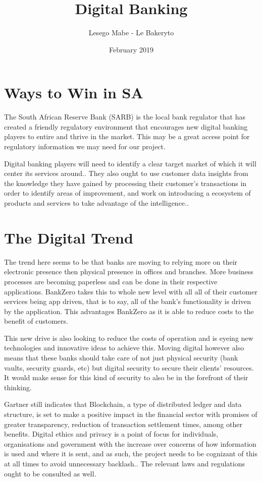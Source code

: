\documentclass{article}
\title{Digital Banking}
\author{Lesego Mabe - Le Bakeryto}
\date{February 2019}
\begin{document}
\maketitle

\section{Ways to Win in SA}

The South African Reserve Bank (SARB) is the local bank regulator that has created a friendly regulatory environment that encourages new digital banking players to entire and thrive in the market.\cite{Website:1} This may be a great access point for regulatory information we may need for our project.

Digital banking players will need to identify a clear target market of which it will center its services around.\cite{Website:1}. They also ought to use customer data insights from the knowledge they have gained by processing their customer's transactions in order to identify areas of improvement, and work on introducing a ecosystem of products and services to take advantage of the intelligence.\cite{Website:1}. 

\section{The Digital Trend}

The trend here seems to be that banks are moving to relying more on their electronic presence then physical presence in offices and branches. More business processes are becoming paperless and can be done in their respective applications. BankZero takes this to whole new level with all all of their customer services being app driven, that is to say, all of the bank's functionality is driven by the application.\cite{Website:2} This advantages BankZero as it is able to reduce costs to the benefit of customers.

This new drive is also looking to reduce the costs of operation and is eyeing new technologies and innovative ideas to achieve this.\cite{Website:1} Moving digital however also means that these banks should take care of not just physical security (bank vaults, security guards, etc) but digital security to secure their clients' resources. It would make sense for this kind of security to also be in the forefront of their thinking.

Gartner still indicates that Blockchain, a type of distributed ledger and data structure, is set to make a positive impact in the financial sector with promises of greater transparency, reduction of transaction settlement times, among other benefits.\cite{Website:3} Digital ethics and privacy is a point of focus for individuals, organisations and government with the increase over concerns of how information is used and where it is sent, and as such, the project needs to be cognizant of this at all times to avoid unnecessary backlash.\cite{Website:3}. The relevant laws and regulations ought to be consulted as well. 



\end{document}
